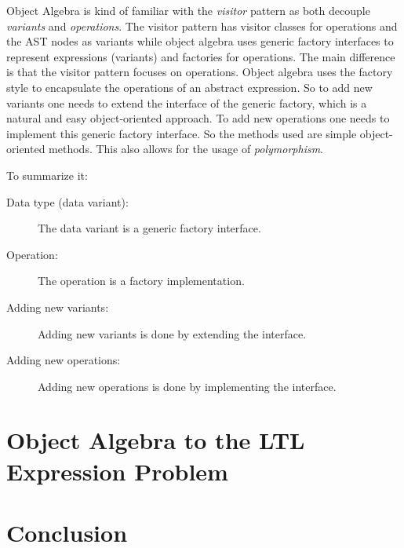 \documentclass{llncs}
\begin{document}
Object Algebra is kind of familiar with the \emph{visitor} pattern as both decouple \emph{variants} and \emph{operations}. The visitor pattern has visitor classes for operations and the AST nodes as variants while object algebra uses generic factory interfaces to represent expressions (variants) and factories for operations. The main difference is that the visitor pattern focuses on operations. Object algebra uses the factory style to encapsulate the operations of an abstract expression. So to add new variants one needs to extend the interface of the generic factory, which is a natural and easy object-oriented approach. To add new operations one needs to implement this generic factory interface. So the methods used are simple object-oriented methods. This also allows for the usage of \emph{polymorphism}.

To summarize it:

\begin{description}
	\item[Data type (data variant):] The data variant is a generic factory interface.
	\item[Operation:] The operation is a factory implementation.
	\item[Adding new variants: ] Adding new variants is done by extending the interface.
	\item[Adding new operations:] Adding new operations is done by implementing the interface.
\end{description}


\section{Object Algebra to the LTL Expression Problem} \label{sec:oa-ltl}
\section{Conclusion} \label{sec:conclusion}
\end{document}
